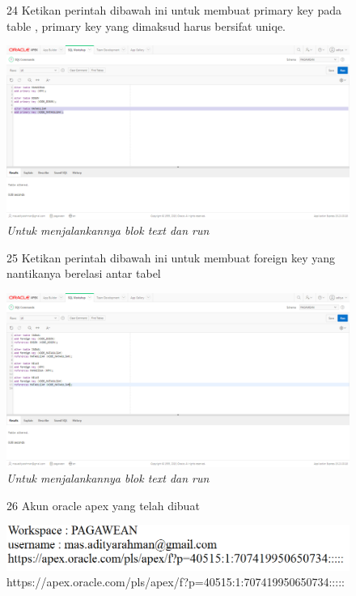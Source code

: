 \begin{enumerate}
\begin{figure}[!htbp]
\item[24]Ketikan perintah dibawah ini untuk membuat primary key pada table , primary key yang dimaksud harus bersifat uniqe.
	\begin{center}
	\includegraphics[scale=0.2]{figures/tahap27.png}
	\caption{\textit{Untuk menjalankannya blok text dan run}}
	\end{center}	 
\end{figure}

\begin{figure}[!htbp]
\item[25]Ketikan perintah dibawah ini untuk membuat foreign key yang nantikanya berelasi antar tabel
	\begin{center}
	\includegraphics[scale=0.2]{figures/tahap28.png}
	\caption{\textit{Untuk menjalankannya blok text dan run}}
	\end{center}	 
\end{figure}

\begin{figure}[!htbp]
\item[26]Akun oracle apex yang telah dibuat \\
	\begin{center}
	\includegraphics[scale=0.2]{figures/tahap24.png} \\
	https://apex.oracle.com/pls/apex/f?p=40515:1:707419950650734:::::
	\end{center}	 
\end{figure}
\end{enumerate}